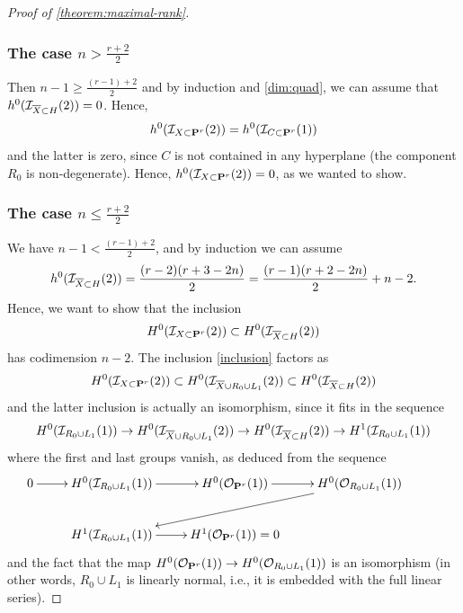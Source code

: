 \documentclass[11pt, two side, letterpaper, final]{amsart}
\renewcommand{\P}{{\bf P}}
\begin{document}
\begin{proof}[Proof of \cref{theorem:maximal-rank}]
\subsubsection*{The case $n > \frac{r+2}{2}$} \label{ssub:large-n}
Then $n-1 \geq \frac{(r-1)+2}{2}$ and by induction and \eqref{dim:quad}, we can assume that 
$h^0({\mathcal I}_{\overline{X} \subset H}(2) )=0$. Hence, 
\[
	h^0(\sh{I}_{X \subset \P^r}(2) ) = h^0(\sh{I}_{C\subset \P^r}(1))
\]
and the latter is zero, since $C$ is not contained in any hyperplane (the component $R_0$ is non-degenerate). Hence, $h^0(\sh{I}_{X \subset \P^r}(2) )=0$, as we wanted to show.
\subsubsection*{The case $n \leq \frac{r+2}{2}$} 
We have $n-1 < \frac{(r-1)+2}{2}$, and by induction 
we can assume
\[
	h^0({\mathcal I}_{\overline{X} \subset H}(2)) = \frac{(r-2)(r+3-2n)}{2} = \frac{(r-1)(r+2-2n)}{2} +n-2.
\]
Hence, we want to show that the inclusion
\begin{equation}\label{inclusion}
	H^0(\sh{I}_{X \subset \P^r}(2)) \subset H^0(\sh{I}_{\overline{X} \subset H}(2))
\end{equation}
has codimension $n-2$. The inclusion \eqref{inclusion} factors as
\begin{equation}\label{inclusion2}
	H^0(\sh{I}_{X \subset \P^r}(2)) \subset H^0(\sh{I}_{\overline{X} \cup R_0 \cup L_1}(2)) \subset H^0(\sh{I}_{\overline{X} \subset H}(2))	
\end{equation}
and the latter inclusion is actually an isomorphism, since it fits in the sequence
\[
	H^0({\mathcal I}_{R_0\cup L_1}(1)) \to H^0({\mathcal I}_{\overline{X} \cup R_0 \cup L_1}(2)) \to H^0({\mathcal I}_{\overline{X} \subset H}(2))	\to H^1({\mathcal I}_{R_0\cup L_1}(1))
\]
where the first and last groups vanish, as deduced from the sequence
\[
\xymatrix{
	0\ar[r] & H^0(\sh{I}_{R_0\cup L_1}(1)) \ar[r]&  H^0(\sh{O}_{\P^r}(1)) \ar[r]& 
	 H^0(\sh{O}_{R_0 \cup L_1}(1))\ar[dll]	&\\ & H^1(\sh{I}_{R_0\cup L_1}(1)) \ar[r]& 
	H^1(\sh{O}_{\P^r}(1))=0	}
\]
and the fact that the map $H^0(\sh{O}_{\P^r}(1)) \to
H^0(\sh{O}_{R_0 \cup L_1}(1))$ is an isomorphism (in other words, $R_0 \cup L_1$ is linearly
normal, i.e., it is embedded with the full linear series).


\end{proof}
\end{document}
